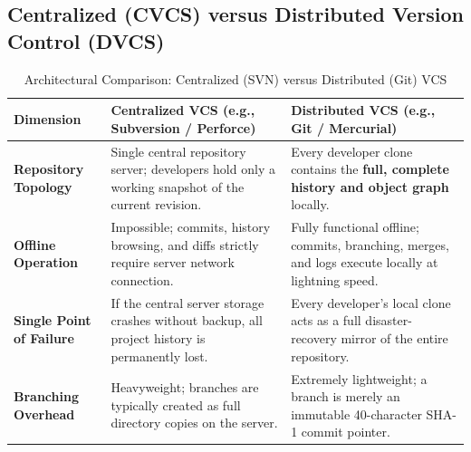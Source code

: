 \subsection{Centralized (CVCS) versus Distributed Version Control (DVCS)}
\begin{table}[htbp]
\centering
\small
\caption{Architectural Comparison: Centralized (SVN) versus Distributed (Git) VCS}
\label{tab:cvcs_vs_dvcs}
\begin{tabularx}{\textwidth}{l p{5cm} X}
\toprule
\textbf{Dimension} & \textbf{Centralized VCS (e.g., Subversion / Perforce)} & \textbf{Distributed VCS (e.g., Git / Mercurial)} \\
\midrule
\textbf{Repository Topology} & Single central repository server; developers hold only a working snapshot of the current revision. & Every developer clone contains the \textbf{full, complete history and object graph} locally. \\
\textbf{Offline Operation} & Impossible; commits, history browsing, and diffs strictly require server network connection. & Fully functional offline; commits, branching, merges, and logs execute locally at lightning speed. \\
\textbf{Single Point of Failure} & If the central server storage crashes without backup, all project history is permanently lost. & Every developer's local clone acts as a full disaster-recovery mirror of the entire repository. \\
\textbf{Branching Overhead} & Heavyweight; branches are typically created as full directory copies on the server. & Extremely lightweight; a branch is merely an immutable 40-character SHA-1 commit pointer. \\
\bottomrule
\end{tabularx}
\end{table}

